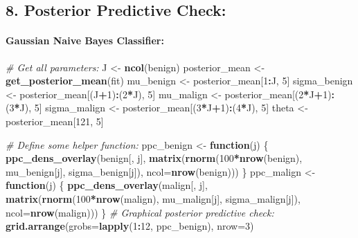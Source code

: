\documentclass[
]{article}
\newenvironment{Shaded}{\begin{snugshade}}{\end{snugshade}}
\newcommand{\CommentTok}[1]{\textcolor[rgb]{0.56,0.35,0.01}{\textit{#1}}}
\newcommand{\ControlFlowTok}[1]{\textcolor[rgb]{0.13,0.29,0.53}{\textbf{#1}}}
\newcommand{\DataTypeTok}[1]{\textcolor[rgb]{0.13,0.29,0.53}{#1}}
\newcommand{\DecValTok}[1]{\textcolor[rgb]{0.00,0.00,0.81}{#1}}
\newcommand{\KeywordTok}[1]{\textcolor[rgb]{0.13,0.29,0.53}{\textbf{#1}}}
\newcommand{\NormalTok}[1]{#1}
\newcommand{\OperatorTok}[1]{\textcolor[rgb]{0.81,0.36,0.00}{\textbf{#1}}}
\newcommand{\StringTok}[1]{\textcolor[rgb]{0.31,0.60,0.02}{#1}}
\begin{document}
\hypertarget{posterior-predictive-check}{%
\subsection{8. Posterior Predictive
Check:}\label{posterior-predictive-check}}

\hypertarget{gaussian-naive-bayes-classifier-4}{%
\paragraph{Gaussian Naive Bayes
Classifier:}\label{gaussian-naive-bayes-classifier-4}}

\begin{Shaded}
\begin{Highlighting}[]
\CommentTok{\# Get all parameters:}
\NormalTok{J \textless{}{-}}\StringTok{ }\KeywordTok{ncol}\NormalTok{(benign)}
\NormalTok{posterior\_mean \textless{}{-}}\StringTok{ }\KeywordTok{get\_posterior\_mean}\NormalTok{(fit)}
\NormalTok{mu\_benign \textless{}{-}}\StringTok{ }\NormalTok{posterior\_mean[}\DecValTok{1}\OperatorTok{:}\NormalTok{J, }\DecValTok{5}\NormalTok{]}
\NormalTok{sigma\_benign \textless{}{-}}\StringTok{ }\NormalTok{posterior\_mean[(J}\OperatorTok{+}\DecValTok{1}\NormalTok{)}\OperatorTok{:}\NormalTok{(}\DecValTok{2}\OperatorTok{*}\NormalTok{J), }\DecValTok{5}\NormalTok{]}
\NormalTok{mu\_malign \textless{}{-}}\StringTok{ }\NormalTok{posterior\_mean[(}\DecValTok{2}\OperatorTok{*}\NormalTok{J}\OperatorTok{+}\DecValTok{1}\NormalTok{)}\OperatorTok{:}\NormalTok{(}\DecValTok{3}\OperatorTok{*}\NormalTok{J), }\DecValTok{5}\NormalTok{]}
\NormalTok{sigma\_malign \textless{}{-}}\StringTok{ }\NormalTok{posterior\_mean[(}\DecValTok{3}\OperatorTok{*}\NormalTok{J}\OperatorTok{+}\DecValTok{1}\NormalTok{)}\OperatorTok{:}\NormalTok{(}\DecValTok{4}\OperatorTok{*}\NormalTok{J), }\DecValTok{5}\NormalTok{]}
\NormalTok{theta \textless{}{-}}\StringTok{ }\NormalTok{posterior\_mean[}\DecValTok{121}\NormalTok{, }\DecValTok{5}\NormalTok{]}

\CommentTok{\# Define some helper function:}
\NormalTok{ppc\_benign \textless{}{-}}\StringTok{ }\ControlFlowTok{function}\NormalTok{(j) \{}
  \KeywordTok{ppc\_dens\_overlay}\NormalTok{(benign[, j], }\KeywordTok{matrix}\NormalTok{(}\KeywordTok{rnorm}\NormalTok{(}\DecValTok{100}\OperatorTok{*}\KeywordTok{nrow}\NormalTok{(benign), mu\_benign[j], sigma\_benign[j]), }\DataTypeTok{ncol=}\KeywordTok{nrow}\NormalTok{(benign)))}
\NormalTok{\}}
\NormalTok{ppc\_malign \textless{}{-}}\StringTok{ }\ControlFlowTok{function}\NormalTok{(j) \{}
  \KeywordTok{ppc\_dens\_overlay}\NormalTok{(malign[, j], }\KeywordTok{matrix}\NormalTok{(}\KeywordTok{rnorm}\NormalTok{(}\DecValTok{100}\OperatorTok{*}\KeywordTok{nrow}\NormalTok{(malign), mu\_malign[j], sigma\_malign[j]), }\DataTypeTok{ncol=}\KeywordTok{nrow}\NormalTok{(malign)))}
\NormalTok{\}}
\CommentTok{\# Graphical posterior predictive check:}
\KeywordTok{grid.arrange}\NormalTok{(}\DataTypeTok{grobs=}\KeywordTok{lapply}\NormalTok{(}\DecValTok{1}\OperatorTok{:}\DecValTok{12}\NormalTok{, ppc\_benign), }\DataTypeTok{nrow=}\DecValTok{3}\NormalTok{)}
\end{Highlighting}
\end{Shaded}
\end{document}
